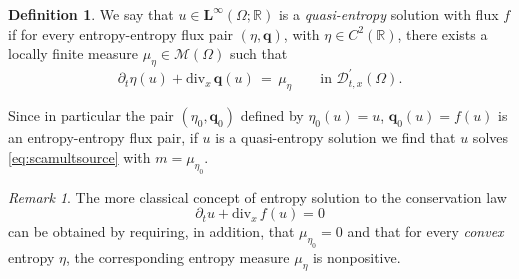 \documentclass[11pt, twoside, reqno]{amsart}
\theoremstyle{definition}
\newtheorem{defi}[thm]{Definition}
\theoremstyle{remark}
\newtheorem{remark}[thm]{Remark}
\numberwithin{equation}{section}
\newcommand{\mr}[1]{\mathrm{#1}}
\newcommand{\bs}[1]{\boldsymbol{#1}}
\newcommand{\msc}[1]{\mathscr{#1}}
\begin{document}
\begin{defi}\label{defi:fes}
    We say that $u \in \mathbf L^\infty(\Omega; \mathbb R)$ is a \textit{quasi-entropy} solution with flux $f$ if for every entropy-entropy flux pair $(\eta, \bs q)$, with $\eta \in C^2(\mathbb R)$, there exists a locally finite measure $\mu_{\eta} \in \msc M(\Omega)$ such that 
    \begin{equation}\label{eq:fenergy}
        \partial_t \eta(u) + \mr{div}_x \, \bs q(u) \, = \, \mu_{\eta} \qquad \text{in $\msc D^\prime_{t,x}(\Omega)$}.
    \end{equation}
\end{defi}
Since in particular the pair $(\eta_0, \bs q_0)$ defined by 
$
\eta_0(u) = u$, $\bs q_0(u) = f(u)
$
is an entropy-entropy flux pair, if $u$ is a quasi-entropy solution we find that $u$ solves \eqref{eq:scamultsource} with $m = \mu_{\eta_0}$.
\begin{remark}
 The more classical concept of entropy solution to the conservation law
 $$
\partial_t u + \mr{div}_x \, f(u) = 0
$$
can be obtained by requiring, in addition, that $\mu_{\eta_0} = 0$ and that for every \textit{convex} entropy $\eta$, the corresponding entropy measure $\mu_{\eta}$ is nonpositive.
\end{remark}
\end{document}
